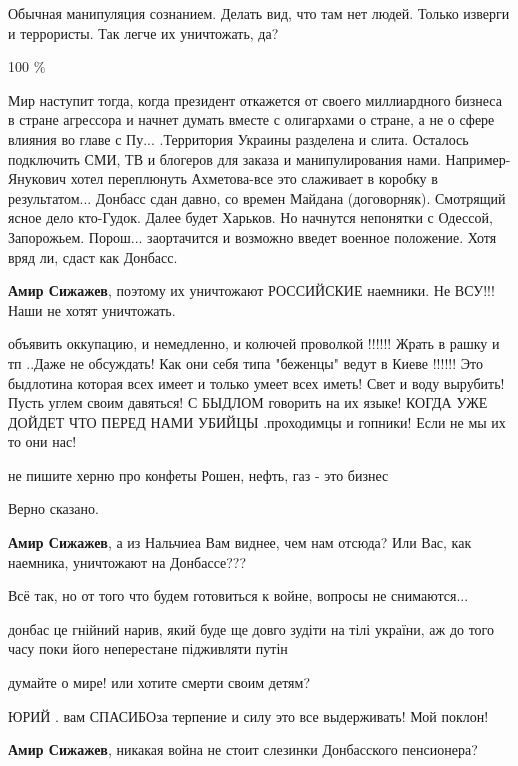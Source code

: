 \begin{itemize}
Обычная манипуляция сознанием. Делать вид, что там нет людей. Только изверги и террористы. Так легче их уничтожать, да?

100 \%


Мир наступит тогда, когда президент откажется от своего миллиардного бизнеса в
стране агрессора и начнет думать вместе с олигархами о стране, а не о сфере
влияния во главе с Пу... .Территория Украины разделена и слита. Осталось
подключить СМИ, ТВ и блогеров для заказа и манипулирования
нами. Например-Янукович хотел переплюнуть Ахметова-все это слаживает в коробку в
результатом... Донбасс сдан давно, со времен Майдана (договорняк). Смотрящий ясное
дело кто-Гудок. Далее будет Харьков. Но начнутся непонятки с
Одессой, Запорожьем. Порош... заортачится и возможно введет военное положение. Хотя
вряд ли, сдаст как Донбасс.

\textbf{Амир Сижажев}, поэтому их уничтожают РОССИЙСКИЕ наемники. Не ВСУ!!! Наши не хотят уничтожать.


объявить оккупацию, и немедленно, и колючей проволкой !!!!!! Жрать в рашку и тп
..Даже не обсуждать! Как они себя типа "беженцы" ведут в Киеве !!!!!! Это
быдлотина которая всех имеет и только умеет всех иметь! Свет и воду
вырубить! Пусть углем своим давяться! С БЫДЛОМ говорить на их языке! КОГДА УЖЕ
ДОЙДЕТ ЧТО ПЕРЕД НАМИ УБИЙЦЫ .проходимцы и гопники! Если не мы их то они нас!

не пишите херню про конфеты Рошен, нефть, газ - это бизнес

Верно сказано.

\textbf{Амир Сижажев}, а из Нальчиеа Вам виднее, чем нам отсюда? Или Вас, как наемника, уничтожают на Донбассе???

Всё так, но от того что будем готовиться к войне, вопросы не снимаются...

донбас це гнійний нарив, який буде ще довго зудіти на тілі україни, аж до того часу поки його неперестане підживляти путін

думайте о мире! или хотите смерти своим детям?

ЮРИЙ . вам СПАСИБОза терпение и силу это все выдерживать! Мой поклон!


\textbf{Амир Сижажев}, никакая война не стоит слезинки Донбасского пенсионера?


\end{itemize}
